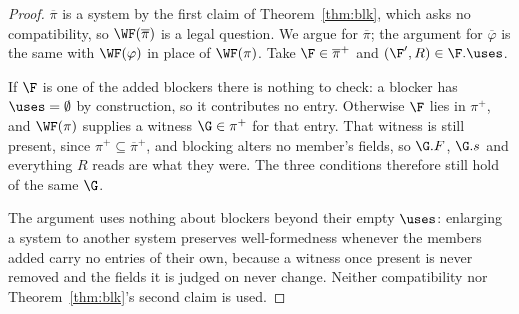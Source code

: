 \documentclass[10pt,oneside,openany]{book}
\theoremstyle{accentdef}
\theoremstyle{accentplain}
\begin{document}
\begin{proof}
$\overline{\pi}$ is a system by the first claim of Theorem~\ref{thm:blk}, which asks no
compatibility, so $\WF(\overline{\pi})$ is a legal question. We argue for $\overline{\pi}$; the
argument for $\overline{\varphi}$ is the same with $\WF(\varphi)$ in place of $\WF(\pi)$. Take
$\F \in \overline{\pi}^{+}$ and $(\F',R) \in \F.\uses$.

If $\F$ is one of the added blockers there is nothing to check: a blocker has
$\uses = \emptyset$ by construction, so it contributes no entry. Otherwise $\F$ lies in $\pi^{+}$,
and $\WF(\pi)$ supplies a witness $\G \in \pi^{+}$ for that entry. That witness is still present,
since $\pi^{+} \subseteq \overline{\pi}^{+}$, and blocking alters no member's fields, so $\G.F$,
$\G.s$ and everything $R$ reads are what they were. The three conditions therefore still hold of
the same $\G$.

The argument uses nothing about blockers beyond their empty $\uses$: enlarging a system to another
system preserves well-formedness whenever the members added carry no entries of their own, because
a witness once present is never removed and the fields it is judged on never change. Neither
compatibility nor Theorem~\ref{thm:blk}'s second claim is used.
\end{proof}
\end{document}
